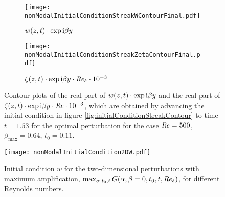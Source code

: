 \documentclass{jfm}
\newcommand\Rey{\mbox{\textit{Re}}}  %
\begin{document}
\begin{figure}
  \centering
  \begin{subfigure}[b]{0.5\textwidth}
    \texttt{[image: nonModalInitialConditionStreakWContourFinal.pdf]}
    \caption{ $ w(z,t) \cdot \exp {\rm i} \beta y $ }
    \label{fig:contourB}
  \end{subfigure} \nolinebreak
  \begin{subfigure}[b]{0.5\textwidth}
    \texttt{[image: nonModalInitialConditionStreakZetaContourFinal.pdf]}
    \caption{ $ \zeta(z,t) \cdot \exp {\rm i} \beta y  \cdot \Rey_\delta \cdot 10^{-3}$ }
    \label{fig:contourC}
  \end{subfigure} 
  \caption{Contour plots of the real part of $ w(z,t) \cdot \exp {\rm i} \beta y $
    and the real part of $ \zeta(z,t)  \cdot \exp {\rm i} \beta y  \cdot \Rey \cdot 10^{-3} $,
    which are obtained by advancing the initial condition in figure \ref{fig:initialConditionStreakContour} to time $ t  = 1.53 $
    for the optimal perturbation for the case $ \Rey = 500 $, $ \beta_{\max} = 0.64 $, $ t_0 = 0.11 $.}
  \label{fig:initialConditionStreakContourFinal}
\end{figure}


\begin{figure}
  \centering
  \texttt{[image: nonModalInitialCondition2DW.pdf]}
  \caption{Initial condition $ w $ %
    for the two-dimensional perturbations with maximum amplification,
    $ \max_{\alpha,t_0,t} G(\alpha,\beta=0,t_0,t,\Rey_\delta) $, for
    different Reynolds numbers.}
  \label{fig:initialCondition2D}
\end{figure}
\end{document}
